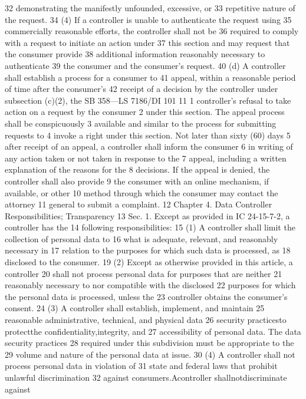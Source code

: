 32 demonstrating the manifestly unfounded, excessive, or
33 repetitive nature of the request.
34 (4) If a controller is unable to authenticate the request using
35 commercially reasonable efforts, the controller shall not be
36 required to comply with a request to initiate an action under
37 this section and may request that the consumer provide
38 additional information reasonably necessary to authenticate
39 the consumer and the consumer's request.
40 (d) A controller shall establish a process for a consumer to
41 appeal, within a reasonable period of time after the consumer's
42 receipt of a decision by the controller under subsection (c)(2), the
SB 358—LS 7186/DI 101
11
1 controller's refusal to take action on a request by the consumer
2 under this section. The appeal process shall be conspicuously
3 available and similar to the process for submitting requests to
4 invoke a right under this section. Not later than sixty (60) days
5 after receipt of an appeal, a controller shall inform the consumer
6 in writing of any action taken or not taken in response to the
7 appeal, including a written explanation of the reasons for the
8 decisions. If the appeal is denied, the controller shall also provide
9 the consumer with an online mechanism, if available, or other
10 method through which the consumer may contact the attorney
11 general to submit a complaint.
12 Chapter 4. Data Controller Responsibilities; Transparency
13 Sec. 1. Except as provided in IC 24-15-7-2, a controller has the
14 following responsibilities:
15 (1) A controller shall limit the collection of personal data to
16 what is adequate, relevant, and reasonably necessary in
17 relation to the purposes for which such data is processed, as
18 disclosed to the consumer.
19 (2) Except as otherwise provided in this article, a controller
20 shall not process personal data for purposes that are neither
21 reasonably necessary to nor compatible with the disclosed
22 purposes for which the personal data is processed, unless the
23 controller obtains the consumer's consent.
24 (3) A controller shall establish, implement, and maintain
25 reasonable administrative, technical, and physical data
26 security practicesto protectthe confidentiality,integrity, and
27 accessibility of personal data. The data security practices
28 required under this subdivision must be appropriate to the
29 volume and nature of the personal data at issue.
30 (4) A controller shall not process personal data in violation of
31 state and federal laws that prohibit unlawful discrimination
32 against consumers.Acontroller shallnotdiscriminate against
